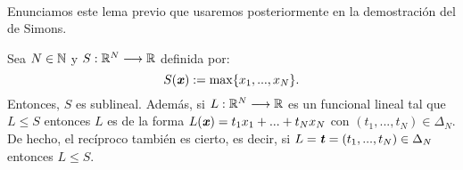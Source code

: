 	\paragraph{}Enunciamos este lema previo que usaremos posteriormente en la demostración del de Simons.
	\begin{lemaBox}\label{lema2.1}
		Sea $ N \in \mathbb{N} $ y $ S: \mathbb{R}^N \longrightarrow \mathbb{R} $ definida por: \[ S(\textbf{\emph{x}}):=\max\{x_1,...,x_N\}.\] Entonces, $ S $ es sublineal. Además, si $ L:\mathbb{R}^N \longrightarrow \mathbb{R} $ es un funcional lineal tal que $ L \leq S $ entonces $ L $ es de la forma $ L(\textbf{\emph{x}}) = t_1 x_1 + ... + t_N x_N $ con $ (t_1,...,t_N) \in \Delta_N$. De hecho, el recíproco también es cierto, es decir, si $ L = \textbf{\emph{t}} = (t_1,...,t_N) \in \Delta_N $ entonces $ L \leq S $.
		
		
	\end{lemaBox}
